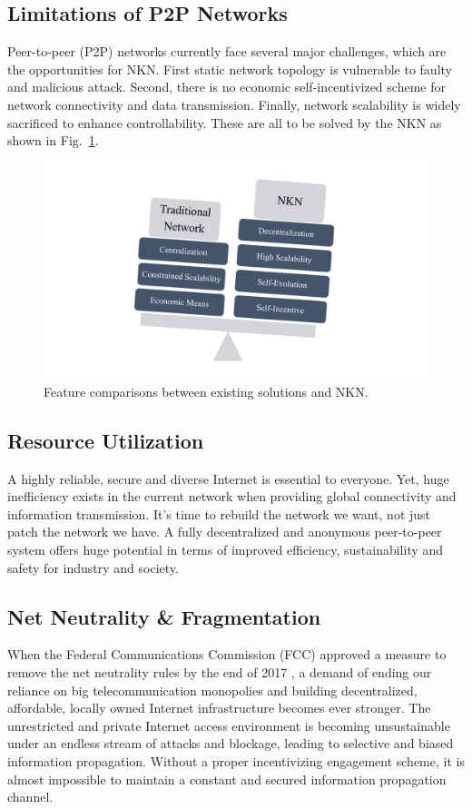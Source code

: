 \documentclass[reprint,pre,aps]{revtex4-1}
\begin{document}
\subsection{Limitations of P2P Networks}

Peer-to-peer (P2P) networks currently face several major challenges, which are the opportunities for NKN.  First static network topology is vulnerable to faulty and malicious attack. Second, there is no economic self-incentivized scheme for network connectivity and data transmission. Finally, network scalability is widely sacrificed to enhance controllability. These are all to be solved by the NKN as shown in Fig.~\ref{fig:feature_compare}.

\begin{figure}[!htp]
\centering
\includegraphics[width=0.8\linewidth]{fig/feature_compare}
\caption{Feature comparisons between existing solutions and NKN.}
\label{fig:feature_compare}
\end{figure}

\subsection{Resource Utilization}

A highly reliable, secure and diverse Internet is essential to everyone. Yet, huge inefficiency exists in the current network when providing global connectivity and information transmission. It's time to rebuild the network we want, not just patch the network we have. A fully decentralized and anonymous peer-to-peer system offers huge potential in terms of improved efficiency, sustainability and safety for industry and society.

\subsection{Net Neutrality \& Fragmentation}

When the Federal Communications Commission (FCC) approved a measure to remove the net neutrality rules by the end of 2017 \cite{restore_internet_freedom}, a demand of ending our reliance on big telecommunication monopolies and building decentralized, affordable, locally owned Internet infrastructure becomes ever stronger. The unrestricted and private Internet access environment is becoming unsustainable under an endless stream of attacks and blockage, leading to selective and biased information propagation. Without a proper incentivizing engagement scheme, it is almost impossible to maintain a constant and secured information propagation channel.
\end{document}
